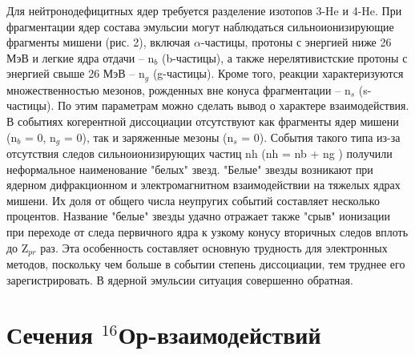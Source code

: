 \documentclass[fontsize=14pt]{scrreport}
\begin{document}
Для нейтронодефицитных ядер требуется разделение изотопов 3-He и 4-He. При фрагментации ядер состава эмульсии могут наблюдаться сильноионизирующие фрагменты мишени (рис. 2), включая $\alpha$-частицы, протоны с энергией ниже 26 МэВ и легкие ядра отдачи – n$_{b}$ (b-частицы), а также нерелятивистские протоны с энергией свыше 26 МэВ – n$_{g}$ (g-частицы). Кроме того, реакции характеризуются множественностью мезонов, рожденных вне конуса фрагментации – n$_{s}$ (s-частицы). По этим параметрам можно сделать вывод о характере взаимодействия. В событиях когерентной диссоциации отсутствуют как фрагменты ядер мишени (n$_{b}$ = 0, n$_{g}$ = 0), так и заряженные мезоны (n$_{s}$ = 0). События такого типа из-за отсутствия следов сильноионизирующих частиц nh (nh = nb + ng ) получили неформальное наименование "белых" звезд. "Белые" звезды возникают при ядерном дифракционном и электромагнитном взаимодействии на тяжелых ядрах мишени. Их доля от общего числа неупругих событий составляет несколько процентов. Название "белые" звезды удачно отражает также "срыв" ионизации при переходе от следа первичного ядра к узкому конусу вторичных следов вплоть до Z$_{pr}$ раз. Эта особенность составляет основную трудность для электронных методов, поскольку чем больше в событии степень диссоциации, тем труднее его зарегистрировать. В ядерной эмульсии ситуация совершенно обратная. 	
\section{Сечения $^{16}$Ор-взаимодействий}
\hspace{0.6cm}
\end{document}
